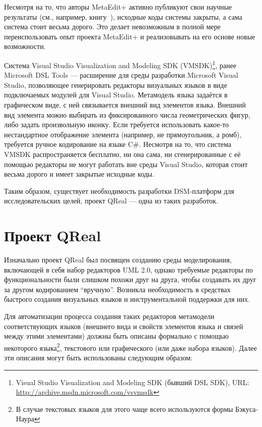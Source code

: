 \documentclass[a4, 12pt]{article}
\begin{document}
Несмотря на то, что авторы MetaEdit+ активно публикуют свои научные результаты (см., например, книгу~\cite{dsmbook}), исходные коды системы закрыты, а сама система стоит весьма дорого. Это делает невозможным в полной мере переиспользовать опыт проекта MetaEdit+ и реализовывать на его основе новые возможности. 
	
Система Visual Studio Visualization and Modeling SDK (VMSDK)\footnote{Visual Studio Visualization and Modeling SDK (бывший DSL SDK), URL: \url{http://archive.msdn.microsoft.com/vsvmsdk}}, ранее Microsoft DSL Tools --- расширение для среды разработки Microsoft Visual Studio, позволяющее генерировать редакторы визуальных языков в виде подключаемых модулей для Visual Studio. Метамодель языка задаётся в графическом виде, с ней связывается внешний вид элементов языка. Внешний вид элемента можно выбирать из фиксированного числа геометрических фигур, либо задать произвольную иконку. Если требуется использовать какое-то нестандартное отображение элемента (например, не прямоугольник, а ромб), требуется ручное кодирование на языке C\#. Несмотря на то, что система VMSDK распространяется бесплатно, ни она сама, ни сгенерированные с её помощью редакторы не могут работать вне среды Visual Studio, которая стоит весьма дорого и имеет закрытые исходные коды.

Таким образом, существует необходимость разработки DSM-платформ для исследовательских целей, проект QReal --- одна из таких разработок.

\section{Проект QReal}

Изначально проект QReal был посвящен созданию среды моделирования, включающей в себя набор редакторов UML 2.0, однако требуемые редакторы по функциональности были слишком похожи друг на друга, чтобы создавать их друг за другом кодированием “вручную”. Возникла необходимость в средствах быстрого создания визуальных языков и инструментальной поддержки для них.

Для автоматизации процесса создания таких редакторов метамодели соответствующих языков (внешнего вида и свойств элементов языка и связей между этими элементами) должны быть описаны формально с помощью некоторого языка\footnote{В случае текстовых языков для этого чаще всего используются формы Бэкуса-Наура}, текстового или графического (или даже набора языков). Далее эти описания могут быть использованы следующим образом:
\end{document}
